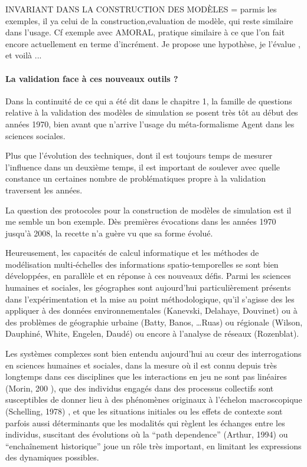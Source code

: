 INVARIANT DANS LA CONSTRUCTION DES MODÈLES = parmis les exemples, il ya celui de la construction,evaluation de modèle, qui reste similaire dans l'usage. Cf exemple avec AMORAL, pratique similaire à ce que l'on fait encore actuellement en terme d'incrément. Je propose une hypothèse, je l'évalue , et voilà ...

\paragraph{La validation face à ces nouveaux outils ?}
\label{p:validation_nouveaux_outils}

Dans la continuité de ce qui a été dit dans le chapitre 1, la famille de questions relative à la validation des modèles de simulation se posent très tôt au début des années 1970, bien avant que n'arrive l'usage du méta-formalisme Agent dans les sciences sociales.

Plus que l'évolution des techniques, dont il est toujours temps de mesurer l'influence dans un deuxième temps, il est important de soulever avec quelle constance un certaines nombre de problématiques propre à la validation traversent les années. 

La question des protocoles pour la construction de modèles de simulation est il me semble un bon exemple. Dès premières évocations dans les années 1970 jusqu'à 2008, la recette n'a guère vu que sa forme évolué.



Heureusement, les capacités de calcul informatique et les méthodes de modélisation multi-échelles des informations spatio-temporelles se sont bien développées, en parallèle et en réponse à ces nouveaux défis. Parmi les sciences humaines et sociales, les géographes sont aujourd'hui particulièrement présents dans l’expérimentation et la mise au point méthodologique, qu’il s’agisse des les appliquer à des données environnementales (Kanevski, Delahaye, Douvinet) ou à des problèmes de géographie urbaine (Batty, Banos, …Ruas) ou régionale (Wilson, Dauphiné, White, Engelen, Daudé) ou encore à l’analyse de réseaux (Rozenblat). 

Les systèmes complexes sont bien entendu aujourd'hui au cœur des interrogations en sciences humaines et sociales, dans la mesure où il est connu depuis très longtemps dans ces disciplines que les interactions en jeu ne sont pas linéaires   (Morin, 200 ), que des individus engagés dans des processus collectifs sont susceptibles de donner lieu à des phénomènes originaux à l’échelon macroscopique (Schelling, 1978) , et que les situations initiales ou les effets de contexte sont parfois aussi déterminants que les modalités qui règlent les échanges entre les individus, suscitant des évolutions où la \foreignquote{english}{path dependence}  (Arthur, 1994) ou \enquote{enchaînement historique} joue un rôle très important, en limitant les expressions des dynamiques possibles.

